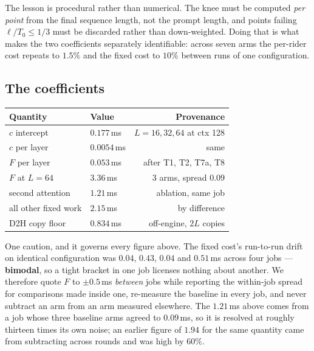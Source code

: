 The lesson is procedural rather than numerical. The knee must be computed
\emph{per point} from the final sequence length, not the prompt length, and points
failing $\ell/T_0 \le 1/3$ must be discarded rather than down-weighted. Doing that
is what makes the two coefficients separately identifiable: across seven arms the
per-rider cost repeats to $1.5\%$ and the fixed cost to $10\%$ between runs of one
configuration.

\subsection{The coefficients}

\begin{center}\small
\begin{tabular}{llr}
\toprule
Quantity & Value & Provenance \\
\midrule
$c$ intercept       & $0.177$\,ms            & $L = 16, 32, 64$ at ctx 128 \\
$c$ per layer       & $0.0054$\,ms           & same \\
$F$ per layer       & $0.053$\,ms            & after T1, T2, T7a, T8 \\
$F$ at $L=64$       & $3.36$\,ms             & 3 arms, spread $0.09$ \\
second attention    & $1.21$\,ms             & ablation, same job \\
all other fixed work & $2.15$\,ms            & by difference \\
D2H copy floor      & $0.834$\,ms            & off-engine, $2L$ copies \\
\bottomrule
\end{tabular}
\end{center}

One caution, and it governs every figure above. The fixed cost's run-to-run drift on
identical configuration was $0.04$, $0.43$, $0.04$ and $0.51$\,ms across four jobs
--- \textbf{bimodal}, so a tight bracket in one job licenses nothing about another.
We therefore quote $F$ to $\pm 0.5$\,ms \emph{between} jobs while reporting the
within-job spread for comparisons made inside one, re-measure the baseline in every
job, and never subtract an arm from an arm measured elsewhere. The $1.21$\,ms above
comes from a job whose three baseline arms agreed to $0.09$\,ms, so it is resolved at
roughly thirteen times its own noise; an earlier figure of $1.94$ for the same
quantity came from subtracting across rounds and was high by $60\%$.

